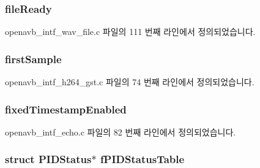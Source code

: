 \subsubsection[{\texorpdfstring{file\+Ready}{fileReady}}]{ file\+Ready}\hypertarget{structpvt__data__t_abef6d85b9c0274f90263744089f8a2b1}{}\label{structpvt__data__t_abef6d85b9c0274f90263744089f8a2b1}


openavb\+\_\+intf\+\_\+wav\+\_\+file.\+c 파일의 111 번째 라인에서 정의되었습니다.

\subsubsection[{\texorpdfstring{first\+Sample}{firstSample}}]{ first\+Sample}\hypertarget{structpvt__data__t_a21d4df265c73842b0fc81b13685214cd}{}\label{structpvt__data__t_a21d4df265c73842b0fc81b13685214cd}


openavb\+\_\+intf\+\_\+h264\+\_\+gst.\+c 파일의 74 번째 라인에서 정의되었습니다.

\subsubsection[{\texorpdfstring{fixed\+Timestamp\+Enabled}{fixedTimestampEnabled}}]{ fixed\+Timestamp\+Enabled}\hypertarget{structpvt__data__t_a0d8529515d357f9b3faa35f1f2ede2c0}{}\label{structpvt__data__t_a0d8529515d357f9b3faa35f1f2ede2c0}


openavb\+\_\+intf\+\_\+echo.\+c 파일의 82 번째 라인에서 정의되었습니다.

\subsubsection[{\texorpdfstring{f\+P\+I\+D\+Status\+Table}{fPIDStatusTable}}]{\setlength{\rightskip}{0pt plus 5cm}struct {\bf P\+I\+D\+Status}$\ast$ f\+P\+I\+D\+Status\+Table}\hypertarget{structpvt__data__t_a8fd6f0d5303b5c766d5fb591845862aa}{}\label{structpvt__data__t_a8fd6f0d5303b5c766d5fb591845862aa}


